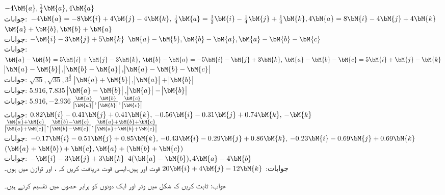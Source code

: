 \quad
$-4\bM{a},\tfrac{1}{4}\bM{a},4\bM{a}$\\
جوابات:
$-4\bM{a}=-8\bM{i}+4\bM{j}-4\bM{k},\, \tfrac{1}{4}\bM{a}=\tfrac{1}{2}\bM{i}-\tfrac{1}{4}\bM{j}+\tfrac{1}{4}\bM{k},4\bM{a}=8\bM{i}-4\bM{j}+4\bM{k}$
\quad
$\bM{a}+\bM{b},\bM{b}+\bM{a}$\\
جوابات:
$-\bM{i}-3\bM{j}+5\bM{k}$
\quad
$\bM{a}-\bM{b},\bM{b}-\bM{a}, \bM{a}-\bM{b}-\bM{c}$\\
جوابات:
$\bM{a}-\bM{b}=5\bM{i}+\bM{j}-3\bM{k}, \,\bM{b}-\bM{a}=-5\bM{i}-\bM{j}+3\bM{k},\, \bM{a}-\bM{b}-\bM{c}=5\bM{i}+\bM{j}-\bM{k}$
\quad
$\abs{\bM{a}-\bM{b}},\abs{\bM{b}-\bM{a}}, \abs{\bM{a}-\bM{b}-\bM{c}}$\\
جوابات:
$\sqrt{35}, \sqrt{35}, 3^{\tfrac{3}{2}}$
\quad
$\abs{\bM{a}+\bM{b}},\abs{\bM{a}}+\abs{\bM{b}}$\\
جوابات:
$5.916, 7.835$
\quad
$\abs{\bM{a}-\bM{b}},\abs{\bM{a}}-\abs{\bM{b}}$\\
جوابات:
$5.916, -2.936$
\quad
$\frac{\bM{a}}{\abs{\bM{a}}},\frac{\bM{b}}{\abs{\bM{b}}},\frac{\bM{c}}{\abs{\bM{c}}}$\\
جوابات:
$0.82\bM{i}-0.41\bM{j}+0.41\bM{k},\, -0.56\bM{i}-0.31\bM{j}+0.74\bM{k},\, -\bM{k}$
\quad
$\frac{\bM{a}+\bM{c}}{\abs{\bM{a}+\bM{c}}},\frac{\bM{b}-\bM{c}}{\abs{\bM{b}-\bM{c}}},\frac{\bM{a}+\bM{b}+\bM{c}}{\abs{\bM{a}+\bM{b}+\bM{c}}}$\\
جوابات:
$-0.17\bM{i}-0.51\bM{j}+0.85\bM{k},\, -0.43\bM{i}-0.29\bM{j}+0.86\bM{k},\, -0.23\bM{i}-0.69\bM{j}+0.69\bM{k}$
\quad
$(\bM{a}+\bM{b})+\bM{c}, \bM{a}+(\bM{b}+\bM{c})$\\
جوابات:
$-\bM{i}-3\bM{j}+3\bM{k}$
\quad
$4(\bM{a}-\bM{b}), 4\bM{a}-4\bM{b}$\\
جوابات:
$20\bM{i}+4\bM{j}-12\bM{k}$
قوت   اور  ہیں۔ایسی قوت  دریافت کریں کہ ،  اور   توازن میں ہوں۔ 

جواب:
ثابت کریں کہ شکل  میں وتر  اور  ایک دونوں کو برابر حصوں میں تقسیم کرتے ہیں۔

